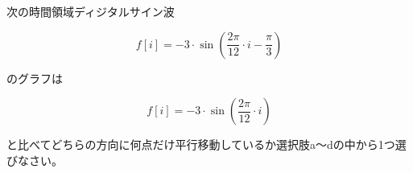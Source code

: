 次の時間領域ディジタルサイン波 

\[
f[i] = -3 \cdot \sin \left ( \frac{2 \pi}{12}  \cdot i - \frac{\pi}{3} \right )
\]

\noindent のグラフは

\[
f[i] = -3 \cdot \sin \left ( \frac{2 \pi}{12}  \cdot i \right )
\]

\noindent と比べてどちらの方向に何点だけ平行移動しているか選択肢a〜dの中から1つ選びなさい。
